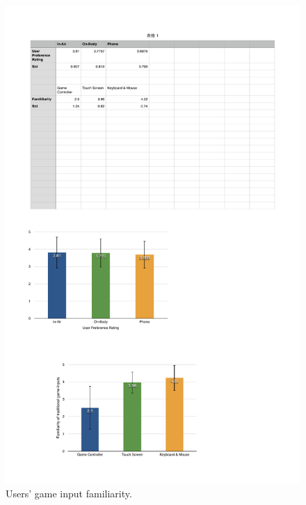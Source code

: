 \documentclass{sigchi}
\begin{document}
  

  \begin{figure}[!h]
  \centering
  \includegraphics[width=0.8\columnwidth]{Familiarity.pdf}
  \caption{Users' game input familiarity.}
  \label{fig:figureFamiliarity}
  \end{figure}  
\end{document}
